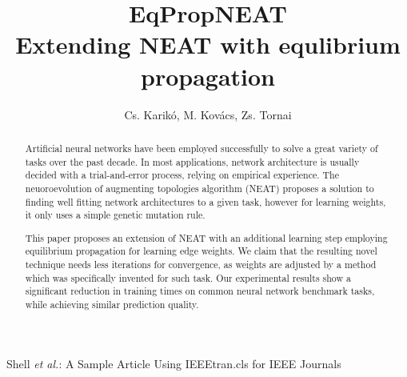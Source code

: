 \documentclass[lettersize,journal]{IEEEtran}
\begin{document}
\title{EqPropNEAT\\Extending NEAT with equlibrium propagation}

\author{Cs. Karikó, M. Kovács, Zs. Tornai
}

%
{Shell \MakeLowercase{\textit{et al.}}: A Sample Article Using IEEEtran.cls for IEEE Journals}


\maketitle

\begin{abstract}
  Artificial neural networks have been employed successfully to solve a great variety of tasks over the past decade. In most applications, network architecture is usually decided with a trial-and-error process, relying on empirical experience.
  The neuoroevolution of augmenting topologies algorithm (NEAT) \cite{neat} proposes a solution to finding well fitting network architectures to a given task, however for learning weights, it only uses a simple genetic mutation rule.

  This paper proposes an extension of NEAT with an additional learning step employing equilibrium propagation \cite{eqprop} for learning edge weights. We claim that the resulting novel technique needs less iterations for convergence, as weights are adjusted by a method which was specifically invented for such task. Our experimental results show a significant reduction in training times on common neural network benchmark tasks, while achieving similar prediction quality.
\end{abstract}

\end{document}
